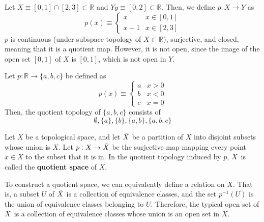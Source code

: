   \begin{example}
    Let $X \equiv [0,1] \cap [2,3] \subset \mathbb{R}$ and $Y y \equiv [0,2] \subset \mathbb{R}$. Then, we define $p: X \rightarrow Y$ as 
    \begin{equation}
      p(x) \equiv \begin{cases} x & x \in [0,1] \\ x-1 & x \in [2,3] \end{cases}
    \end{equation}
    $p$ is continuous (under subspace topology of $X \subset \mathbb{R}$), surjective, and closed, meaning that it is a quotient map. However, it is not open, since the image of the open set $[0,1]$ of $X$ is $[0,1]$, which is not open in $Y$. 
  \end{example}

  \begin{example}
    Let $p: \mathbb{R} \rightarrow \{a, b, c\}$ be defined as 
    \begin{equation}
      p(x) \equiv \begin{cases} a & x > 0 \\ b & x < 0 \\ c & x = 0 \end{cases}
    \end{equation}
    Then, the quotient topology of $\{a, b, c\}$ consists of 
    \begin{equation}
      \emptyset, \{a\}, \{b\}, \{a, b\}, \{a, b, c\}
    \end{equation}
  \end{example}

  \begin{definition}
    Let $X$ be a topological space, and let $\Tilde{X}$ be a partition of $X$ into disjoint subsets whose union is $X$. Let $p: X \rightarrow \Tilde{X}$ be the surjective map mapping every point $x \in X$ to the subset that it is in. In the quotient topology induced by $p$, $\Tilde{X}$ is called the \textbf{quotient space} of $X$. 
  \end{definition}

  To construct a quotient space, we can equivalently define a relation on $X$. That is, a subset $U$ of $\Tilde{X}$ is a collection of equivalence classes, and the set $p^{-1}(U)$ is the union of equivalence classes belonging to $U$. Therefore, the typical open set of $\Tilde{X}$ is a collection of equivalence classes whose union is an open set in $X$. 

